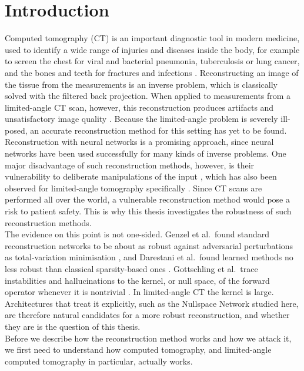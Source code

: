 \documentclass{article}
\numberwithin{equation}{section}
\begin{document}
\section{Introduction}
Computed tomography (CT) is an important diagnostic tool in modern medicine, used to identify a wide range of injuries and diseases inside the body, for example to screen the chest for viral and bacterial pneumonia, tuberculosis or lung cancer, and the bones and teeth for fractures and infections \parencite{CT-Scan}.
Reconstructing an image of the tissue from the measurements is an inverse problem, which is classically solved with the filtered back projection.
When applied to measurements from a limited-angle CT scan, however, this reconstruction produces artifacts and unsatisfactory image quality \parencite{CT-LA-CNN}.
Because the limited-angle problem is severely ill-posed, an accurate reconstruction method for this setting has yet to be found. Reconstruction with neural networks is a promising approach,
since neural networks have been used successfully for many kinds of inverse problems.
One major disadvantage of such reconstruction methods, however, is their vulnerability to deliberate manipulations of the input \parencite{instab},
which has also been observed for limited-angle tomography specifically \parencite{huang2018robustness}.
Since CT scans are performed all over the world, a vulnerable reconstruction method would pose a risk to patient safety.
This is why this thesis investigates the robustness of such reconstruction methods.\\
The evidence on this point is not one-sided. Genzel et al.\ found standard reconstruction networks to be about as robust against adversarial perturbations as total-variation minimisation \parencite{genzel2023robustness},
and Darestani et al.\ found learned methods no less robust than classical sparsity-based ones \parencite{darestani2021measuring}. Gottschling et al.\ trace instabilities and hallucinations to the kernel,
or null space, of the forward operator whenever it is nontrivial \parencite{gottschling2025troublesome}.
In limited-angle CT the kernel is large. Architectures that treat it explicitly, such as the Nullspace Network studied here, are therefore natural candidates for a more robust reconstruction, and whether they are is the question of this thesis.\\
Before we describe how the reconstruction method works and how we attack it, we first need to understand how computed tomography, and limited-angle computed tomography in particular, actually works.
\end{document}
